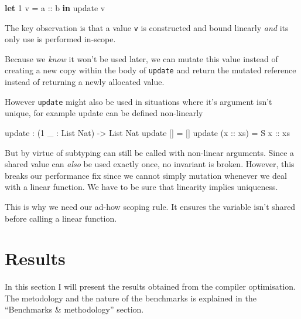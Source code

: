 \documentclass[
]{article}
\newenvironment{Shaded}{}{}
\newcommand{\DataTypeTok}[1]{\textcolor[rgb]{0.56,0.13,0.00}{#1}}
\newcommand{\DecValTok}[1]{\textcolor[rgb]{0.25,0.63,0.44}{#1}}
\newcommand{\KeywordTok}[1]{\textcolor[rgb]{0.00,0.44,0.13}{\textbf{#1}}}
\newcommand{\NormalTok}[1]{#1}
\newcommand{\OperatorTok}[1]{\textcolor[rgb]{0.40,0.40,0.40}{#1}}
\newcommand{\OtherTok}[1]{\textcolor[rgb]{0.00,0.44,0.13}{#1}}
\begin{document}
\begin{Shaded}
\begin{Highlighting}[]
\KeywordTok{let} \DecValTok{1}\NormalTok{ v }\OtherTok{= a ::}\NormalTok{ b }\KeywordTok{in}
\NormalTok{    update v}
\end{Highlighting}
\end{Shaded}

The key observation is that a value \texttt{v} is constructed and bound
linearly \emph{and} its only use is performed in-scope.

Because we \emph{know} it won't be used later, we can mutate this value
instead of creating a new copy within the body of \texttt{update} and
return the mutated reference instead of returning a newly allocated
value.

However \texttt{update} might also be used in situations where it's
argument isn't unique, for example update can be defined non-linearly

\begin{Shaded}
\begin{Highlighting}[]
\NormalTok{update }\OperatorTok{:}\NormalTok{ (}\DecValTok{1}\NormalTok{ \_ }\OperatorTok{:} \DataTypeTok{List} \DataTypeTok{Nat}\NormalTok{) }\OtherTok{{-}\textgreater{}} \DataTypeTok{List} \DataTypeTok{Nat}
\NormalTok{update [] }\OtherTok{=}\NormalTok{ []}
\NormalTok{update (}\OtherTok{x ::}\NormalTok{ xs) }\OtherTok{=} \DataTypeTok{S}\OtherTok{ x ::}\NormalTok{ xs}
\end{Highlighting}
\end{Shaded}

But by virtue of subtyping can still be called with non-linear
arguments. Since a shared value can \emph{also} be used exactly once, no
invariant is broken. However, this breaks our performance fix since we
cannot simply mutation whenever we deal with a linear function. We have
to be sure that linearity implies uniqueness.

This is why we need our ad-how scoping rule. It ensures the variable
isn't shared before calling a linear function.

\hypertarget{results}{%
\section{Results}\label{results}}

In this section I will present the results obtained from the compiler
optimisation. The metodology and the nature of the benchmarks is
explained in the ``Benchmarks \& methodology'' section.
\end{document}
